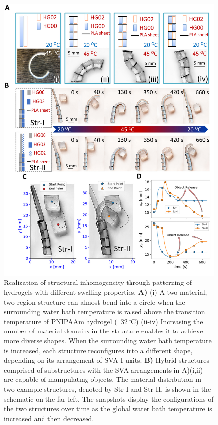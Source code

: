 \begin{figure}[t]
\centering
\includegraphics[width=\textwidth]{fig3.pdf}
\caption{Realization of structural inhomogeneity through patterning of hydrogels with different swelling properties. \textbf{A)} (i) A two-material, two-region structure can almost bend into a circle when the surrounding water bath temperature is raised  above the transition temperature of PNIPAAm hydrogel (~32\,$^{\circ}$C) (ii-iv) Increasing the number of material domains in the structure enables it to achieve more diverse shapes. When the surrounding water bath temperature is increased, each structure reconfigures into a different shape, depending on its arrangement of SVA-I units. \textbf{B)} Hybrid structures comprised of substructures with the SVA arrangements in A)(i,ii) are
capable of manipulating objects. The material distribution in two example structures, denoted by Str-I and Str-II, is shown in the schematic on the far left. The snapshots display the configurations of the two structures over time as the global water bath temperature is increased and then decreased.
}
\end{figure}
